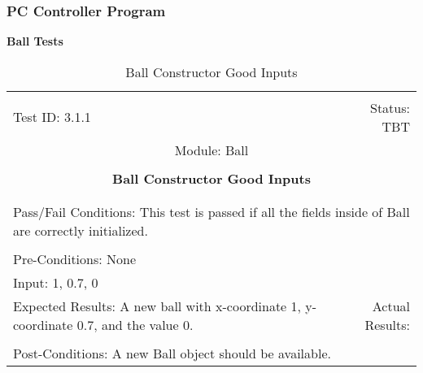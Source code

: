 \documentclass[titlepage]{article}
\begin{document}
\subsubsection{PC Controller Program}
\large{\textbf{Ball Tests}}
\begin{center}%
\begin{table}
\begin{tabular}{|l r|}\hline&\\[-2mm]
	Test ID: 3.1.1	&Status: TBT\\[-3mm]
	\multicolumn{2}{|c|}{Module: Ball}\\&\\
	\multicolumn{2}{|c|}{\textbf{\large{Ball Constructor Good Inputs}}}\\&\\\hline&\\[-3mm]
	\multicolumn{2}{|p{\textwidth}|}{Pass/Fail Conditions: This test is passed if all the fields inside of Ball are correctly initialized.}\\[1mm]\hline&\\[-3mm]
	\multicolumn{2}{|p{\textwidth}|}{Pre-Conditions: None}\\[4mm]
	\multicolumn{2}{|p{\textwidth}|}{Input: 1, 0.7, 0}\\[2mm]\hline
	\multicolumn{1}{|p{0.49\textwidth}}{Expected Results: A new ball with x-coordinate 1, y-coordinate 0.7, and the value 0.}	&\multicolumn{1}{|p{0.45\textwidth}|}{Actual Results:}\\\hline&\\[-3mm]
	\multicolumn{2}{|p{\textwidth}|}{Post-Conditions: A new Ball object should be available.}\\\hline
\end{tabular}
\caption{Ball Constructor Good Inputs}
\end{table}
\end{center}
\end{document}
